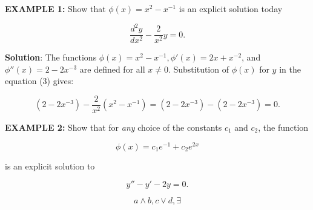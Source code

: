 \documentclass[11pt]{article}
\begin{document}
\textbf{EXAMPLE 1:} Show that $\phi(x) = x^{2} - x^{-1}$ is an explicit solution today

\[
    \frac{d^{2}y}{dx^{2}} - \frac{2}{x^{2}}y = 0.
\]

\textbf{Solution}: The functions $\phi(x) = x^{2} - x^{-1}, \phi'(x) = 2x + x^{-2}$, and $\phi''(x) = 2 - 2x^{-3}$ are defined for all
$x \not = 0$. Substitution of $\phi(x)$ for $y$ in the equation (3) gives:

\[
    (2-2x^{-3})- \frac{2}{x^{2}}(x^{2}-x^{-1}) =  (2-2x^{-3}) - (2-2x^{-3}) = 0.
\]

\textbf{EXAMPLE 2:} Show that for \textit{any} choice of the constants $c_1$ and $c_2$, the function

\[
    \phi(x) = c_{1}e^{-1} + c_2e^{2x}
\]

is an explicit solution to

\[
    y'' -  y' -2y = 0. \tag{4}
\]


\newpage
\[
    a \land b, c \lor d, \exists
\]
\end{document}
